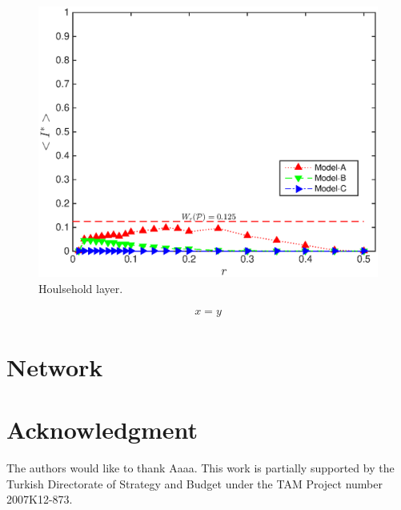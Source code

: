 \documentclass[10pt,journal,compsoc]{IEEEtran}
\theoremstyle{plain}
\theoremstyle{definition}
\theoremstyle{remark}
\begin{document}
\begin{figure}[htbp]
\begin{center}
	\includegraphics[width=\columnwidth]
		{Fig-FigureA}
	\caption{Houlsehold layer.}
	\label{fig:figureA}
\end{center}
\end{figure}

\begin{align}
	x = y
	\label{eq:bbb}
\end{align}




\section{Network}




\section*{Acknowledgment}

The authors would like to thank Aaaa.
%
This work is partially supported by 
the Turkish Directorate of Strategy and Budget
under the TAM Project number 2007K12-873.




\end{document}
